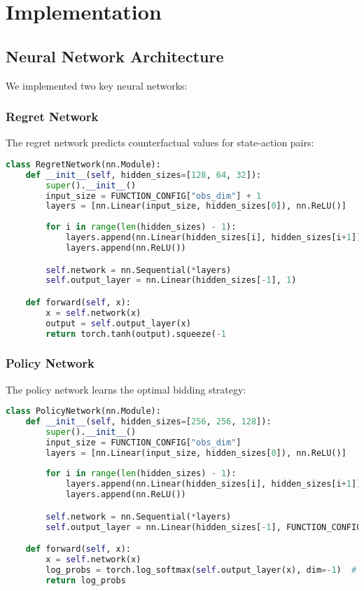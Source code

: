 \documentclass[11pt]{article}
\begin{document}
\section{Implementation}
\subsection{Neural Network Architecture}
We implemented two key neural networks:

\subsubsection{Regret Network}
The regret network predicts counterfactual values for state-action pairs:
\begin{lstlisting}[language=Python]
    class RegretNetwork(nn.Module):
    def __init__(self, hidden_sizes=[128, 64, 32]):
        super().__init__()
        input_size = FUNCTION_CONFIG["obs_dim"] + 1
        layers = [nn.Linear(input_size, hidden_sizes[0]), nn.ReLU()]
        
        for i in range(len(hidden_sizes) - 1):
            layers.append(nn.Linear(hidden_sizes[i], hidden_sizes[i+1]))
            layers.append(nn.ReLU())

        self.network = nn.Sequential(*layers)
        self.output_layer = nn.Linear(hidden_sizes[-1], 1)

    def forward(self, x):
        x = self.network(x)  
        output = self.output_layer(x)  
        return torch.tanh(output).squeeze(-1
\end{lstlisting}

\subsubsection{Policy Network}
The policy network learns the optimal bidding strategy:
\begin{lstlisting}[language=Python]
    class PolicyNetwork(nn.Module):
    def __init__(self, hidden_sizes=[256, 256, 128]):
        super().__init__()
        input_size = FUNCTION_CONFIG["obs_dim"]
        layers = [nn.Linear(input_size, hidden_sizes[0]), nn.ReLU()]
        
        for i in range(len(hidden_sizes) - 1):
            layers.append(nn.Linear(hidden_sizes[i], hidden_sizes[i+1]))
            layers.append(nn.ReLU())

        self.network = nn.Sequential(*layers)
        self.output_layer = nn.Linear(hidden_sizes[-1], FUNCTION_CONFIG["n_discrete"])

    def forward(self, x):
        x = self.network(x)  
        log_probs = torch.log_softmax(self.output_layer(x), dim=-1)  # Log-probabilities
        return log_probs
\end{lstlisting}
\end{document}
